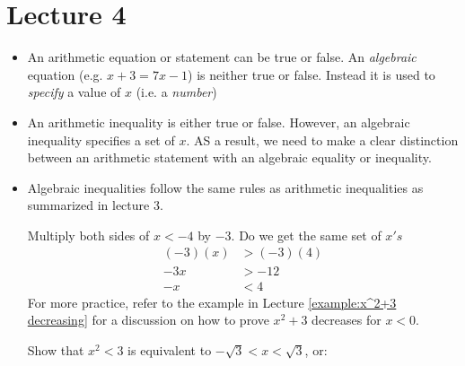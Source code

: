 \section{Lecture 4}
\begin{itemize}
    \item An arithmetic equation or statement can be true or false. An \textit{algebraic} equation (e.g. $x+3=7x-1$) is neither true or false. Instead it is used to \textit{specify} a value of $x$ (i.e. a \textit{number})
    \item An arithmetic inequality is either true or false. However, an algebraic inequality specifies a set of $x$. AS a result, we need to make a clear distinction between an arithmetic statement with an algebraic equality or inequality.
    \item Algebraic inequalities follow the same rules as arithmetic inequalities as summarized in lecture 3.
    \begin{example}
        Multiply both sides of $x<-4$ by $-3$. Do we get the same set of $x's$
        \begin{align}
        (-3)(x) &> (-3)(4) \\ 
        -3x &> -12 \\
        -x &< 4
        \end{align}
        For more practice, refer to the example in Lecture \ref{example:x^2+3 decreasing} for a discussion on how to prove $x^2+3$ decreases for $x<0$.
    \end{example}
    \begin{example}
        Show that $x^2<3$ is equivalent to $-\sqrt{3}<x<\sqrt{3}$, or:
        \begin{center}

\end{center}
\end{example}
\end{itemize}
